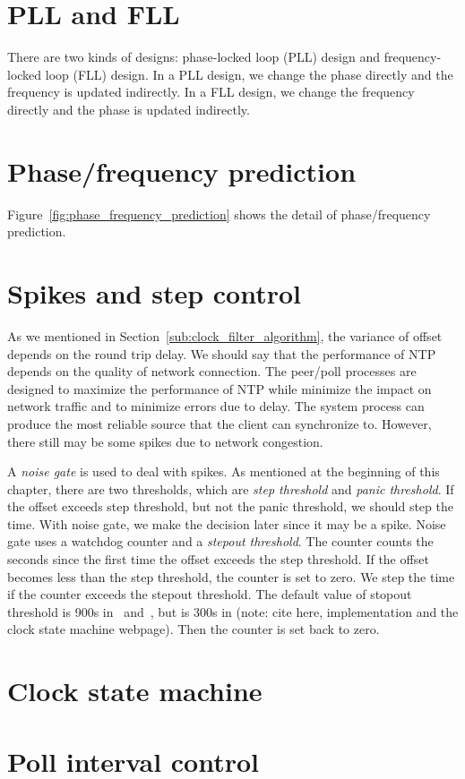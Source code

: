 

\section{PLL and FLL}%
\label{sec:pll_and_fll}
There are two kinds of designs: phase-locked loop (PLL) design and
frequency-locked loop (FLL) design. In a PLL design, we change the phase
directly and the frequency is updated indirectly. In a FLL design, we change
the frequency directly and the phase is updated indirectly.

\section{Phase/frequency prediction}%
\label{sec:phase_frequency_prediction}
Figure~\ref{fig:phase_frequency_prediction} shows the detail of phase/frequency
prediction.



\section{Spikes and step control}%
\label{sec:spikes_and_step_control}
As we mentioned in Section~\ref{sub:clock_filter_algorithm}, the variance of
offset depends on the round trip delay. We should say that the performance of
NTP depends on the quality of network connection. The peer/poll processes are
designed to maximize the performance of NTP while minimize the impact on
network traffic and to minimize errors due to delay. The system process can
produce the most reliable source that the client can synchronize to. However, 
there still may be some spikes due to network congestion. 

A \emph{noise gate} is used to deal with spikes. As mentioned at the beginning 
of this chapter, there are two thresholds, which are \emph{step threshold} and 
\emph{panic threshold}. If the offset exceeds step threshold, but not the panic
threshold, we should step the time. With noise gate, we make the decision later
since it may be a spike. Noise gate uses a watchdog counter and a
\emph{stepout threshold}. The counter counts the seconds since the first time 
the offset exceeds the step threshold. If the offset becomes less than the
step threshold, the counter is set to zero. We step the time if the counter
exceeds the stepout threshold. The default value of stopout threshold is 900s
in~\cite{redbook} and~\cite{rfc5905}, but is 300s in (note: cite here,
implementation and the clock state machine webpage). Then the counter is set back
to zero.

\section{Clock state machine}%
\label{sec:clock_state_machine}


\section{Poll interval control}%
\label{sec:poll_interval_control}


